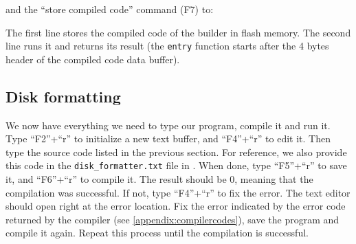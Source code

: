 \noindent and the ``store compiled code'' command (F7) to:


The first line stores the compiled code of the builder in flash memory. The
second line runs it and returns its result (the {\tt entry} function starts
after the 4 bytes header of the compiled code data buffer).

\subsection{Disk formatting}

We now have everything we need to type our program, compile it and run it. Type
``F2''+``r'' to initialize a new text buffer, and ``F4''+``r'' to edit it. Then
type the source code listed in the previous section. For reference, we also
provide this code in the {\tt disk\_formatter.txt} file in
. When done, type ``F5''+``r'' to save it, and
``F6''+``r'' to compile it. The result should be 0, meaning that the
compilation was successful. If not, type ``F4''+``r'' to fix the error. The
text editor should open right at the error location. Fix the error indicated by
the error code returned by the compiler (see \cref{appendix:compilercodes}),
save the program and compile it again. Repeat this process until the
compilation is successful.


